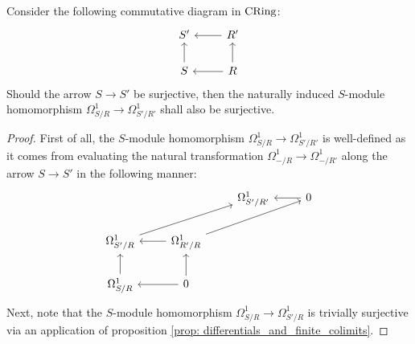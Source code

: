             \begin{lemma} \label{lemma: surjections_between_modules_of_differentials}
                Consider the following commutative diagram in $\mathrm{CRing}$:
                    $$
                        \begin{tikzcd}
                        	{S'} & {R'} \\
                        	S & R
                        	\arrow[from=2-1, to=1-1]
                        	\arrow[from=2-2, to=1-2]
                        	\arrow[from=1-2, to=1-1]
                        	\arrow[from=2-2, to=2-1]
                        \end{tikzcd}
                    $$
                Should the arrow $S \to S'$ be surjective, then the naturally induced $S$-module homomorphism $\Omega^1_{S/R} \to \Omega^1_{S'/R'}$ shall also be surjective.
            \end{lemma}
                \begin{proof}
                    First of all, the $S$-module homomorphism $\Omega^1_{S/R} \to \Omega^1_{S'/R'}$ is well-defined as it comes from evaluating the natural transformation $\Omega^1_{-/R} \to \Omega^1_{-/R'}$ along the arrow $S \to S'$ in the following manner:
                        $$
                            \begin{tikzcd}
                            	& {} & {\Omega^1_{S'/R'}} & 0 \\
                            	{\Omega^1_{S'/R}} & {\Omega^1_{R'/R}} \\
                            	{\Omega^1_{S/R}} & 0
                            	\arrow[from=3-2, to=2-2]
                            	\arrow[from=3-2, to=3-1]
                            	\arrow[from=3-1, to=2-1]
                            	\arrow[from=2-2, to=2-1]
                            	\arrow[from=1-4, to=1-3]
                            	\arrow[from=2-1, to=1-3]
                            	\arrow[from=2-2, to=1-4]
                            \end{tikzcd}
                        $$
                    Next, note that the $S$-module homomorphism $\Omega^1_{S/R} \to \Omega^1_{S'/R}$ is trivially surjective via an application of proposition \ref{prop: differentials_and_finite_colimits}.
                \end{proof}
                
